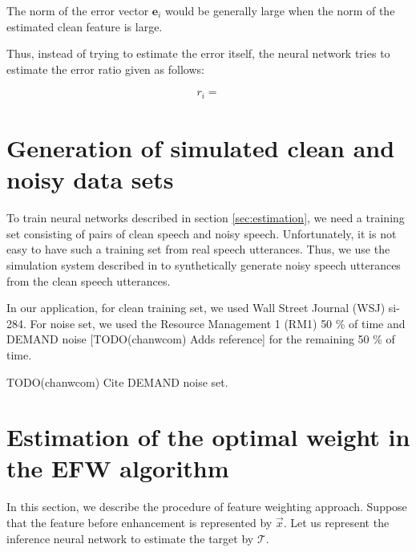\documentclass{article}
\begin{document}
The norm of the error vector $\boldsymbol{e}_i$ would be generally large when
the norm of the estimated clean feature is large.

Thus, instead of trying to estimate the error itself, the neural network tries to
estimate the error ratio given as follows:

\begin{align}
  r_i = {}{}
\end{align}

\section{Generation of simulated clean and noisy data sets}
\label{gen_inst}

To train neural networks described in section \ref{sec:estimation}, we
need a training set consisting of pairs of clean speech and noisy speech.
Unfortunately, it is not easy to have such a training set from real speech
utterances. Thus, we use the simulation system described in
\cite{C_Kim_INTERSPEECH_2017_1} to synthetically generate noisy speech
utterances from the clean speech utterances.

In our application, for clean training set, we used Wall Street Journal (WSJ)
si-284. For noise set, we used the Resource Management 1 (RM1)
\cite{price_p_ldc_1993} 50 \% of time 
and DEMAND noise [TODO(chanwcom) Adds reference] for the remaining 50 \% of time.

TODO(chanwcom) Cite DEMAND noise set.





%
%
%
%
%
%
\section{Estimation of the optimal weight in the EFW algorithm}
In this section, we describe the procedure of feature weighting approach.
Suppose that the feature before enhancement is represented by $\vec{x}$.
Let us represent the inference neural network to estimate the target by
$\mathcal{T}$.
\end{document}
